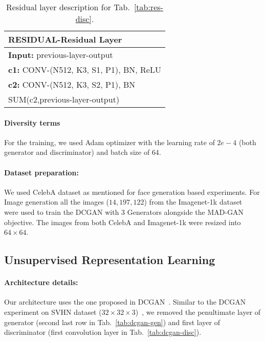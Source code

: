 \begin{center}
	\begin{table}
		\begin{tabular}{ | m{22em} |} 
			\hline
			\textbf{RESIDUAL}-Residual Layer \\
			\hline
			\textbf{Input:} previous-layer-output \\
			\hline
			\textbf{c1:} CONV-(N512, K3, S1, P1), BN, ReLU \\
			\hline
			\textbf{c2:} CONV-(N512, K3, S2, P1), BN \\
			\hline
			SUM(c2,previous-layer-output) \\
			\hline
		\end{tabular}
		\caption{\label{tab:res-layer}Residual layer description for Tab.~\ref{tab:res-disc}.}
	\end{table}
\end{center}

\paragraph{Diversity terms}

For the training, we used Adam optimizer with the learning rate of $2e-4$ (both generator and discriminator) and batch size of $64$.

\paragraph{Dataset preparation:} We used CelebA dataset as mentioned for face generation based experiments. For Image generation all the images ($14,197,122$) from the Imagenet-1k dataset~\cite{Deng09ImageNet} were used to train the DCGAN with $3$ Generators alongside the MAD-GAN objective. The images from both CelebA and Imagenet-1k were resized into $64\times 64$.

\subsection{Unsupervised Representation Learning}
\paragraph{Architecture details:} Our architecture uses the one proposed in DCGAN~\cite{radford2015unsupervised}. Similar to the DCGAN experiment on SVHN dataset ($32\times 32\times 3$)~\cite{Netzer11SVHN}, we removed the penultimate layer of generator (second last row in Tab.~\ref{tab:dcgan-gen}) and first layer of discriminator (first convolution layer in Tab.~\ref{tab:dcgan-disc}).

